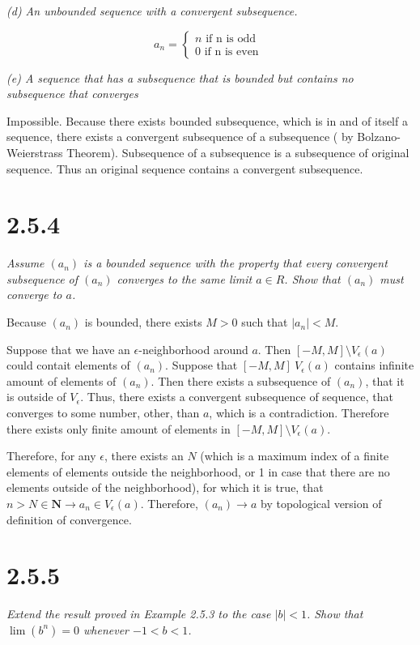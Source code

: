 \documentclass[11pt,oneside,titlepage]{article}
\begin{document}
\textit{(d) An unbounded sequence with a convergent subsequence.}

\begin{equation}
  a_n =
  \begin{cases}
    n \text{ if n is odd } \\
    0 \text{ if n is even }
  \end{cases}
\end{equation}

\textit{(e) A sequence that has a subsequence that is bounded but contains no
  subsequence that converges}

Impossible. Because there exists bounded subsequence, which is in and of itself
a sequence, there exists a convergent subsequence of a subsequence ( by
Bolzano-Weierstrass Theorem). Subsequence of a subsequence is a subsequence of
original sequence. Thus an original sequence contains a convergent
subsequence.

\section*{2.5.4}
\textit{Assume $(a_n)$ is a bounded sequence with the property that every
  convergent subsequence of $(a_n)$ converges to the same limit $a \in R$.
  Show that $(a_n)$ must converge to $a$.}


Because $(a_n)$ is bounded, there exists $M > 0$ such that
$|a_n| < M$.

Suppose that we have an $\epsilon$-neighborhood around $a$. Then
$[-M, M] \setminus V_{\epsilon}(a)$ could contait elements of $(a_n)$.
Suppose that $[-M, M] \ V_{\epsilon}(a)$ contains infinite amount of elements
of $(a_n)$. Then there exists a subsequence of $(a_n)$, that
it is outside of  $V_{\epsilon}$. Thus, there exists a convergent subsequence
of sequence, that converges to some number, other, than $a$, which is a
contradiction. Therefore there exists only finite amount of elements in
$[-M, M] \setminus V_{\epsilon}(a)$.

Therefore, for any $\epsilon$, there exists an $N$ (which is
a maximum index of a finite elements of elements outside the neighborhood, or
1 in case that there are no elements outside of the neighborhood),
for which it is true, that $n > N \in \textbf{N} \to a_n \in V_{\epsilon}(a)$.
Therefore, $(a_n) \to a$ by topological version of definition of convergence.

\section*{2.5.5}
\textit{Extend the result proved in Example 2.5.3 to the case $|b| < 1$.
  Show that $\lim (b^n) = 0$ whenever $-1 < b < 1$.}
\end{document}
